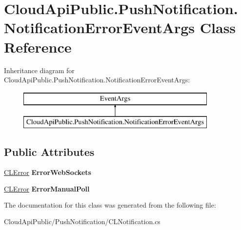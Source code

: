 \hypertarget{class_cloud_api_public_1_1_push_notification_1_1_notification_error_event_args}{\section{Cloud\-Api\-Public.\-Push\-Notification.\-Notification\-Error\-Event\-Args Class Reference}
\label{class_cloud_api_public_1_1_push_notification_1_1_notification_error_event_args}
}
Inheritance diagram for Cloud\-Api\-Public.\-Push\-Notification.\-Notification\-Error\-Event\-Args\-:\begin{figure}[H]
\begin{center}
\leavevmode
\includegraphics[height=2.000000cm]{class_cloud_api_public_1_1_push_notification_1_1_notification_error_event_args}
\end{center}
\end{figure}
\subsection*{Public Attributes}
\begin{DoxyCompactItemize}
\item 
\hypertarget{class_cloud_api_public_1_1_push_notification_1_1_notification_error_event_args_a28137f042bc4032e893e29a4a212b682}{\hyperlink{class_cloud_api_public_1_1_model_1_1_c_l_error}{C\-L\-Error} {\bfseries Error\-Web\-Sockets}}\label{class_cloud_api_public_1_1_push_notification_1_1_notification_error_event_args_a28137f042bc4032e893e29a4a212b682}

\item 
\hypertarget{class_cloud_api_public_1_1_push_notification_1_1_notification_error_event_args_ad7549deefaa1930c14796e8b6f103a77}{\hyperlink{class_cloud_api_public_1_1_model_1_1_c_l_error}{C\-L\-Error} {\bfseries Error\-Manual\-Poll}}\label{class_cloud_api_public_1_1_push_notification_1_1_notification_error_event_args_ad7549deefaa1930c14796e8b6f103a77}

\end{DoxyCompactItemize}


The documentation for this class was generated from the following file\-:\begin{DoxyCompactItemize}
\item 
Cloud\-Api\-Public/\-Push\-Notification/C\-L\-Notification.\-cs\end{DoxyCompactItemize}
